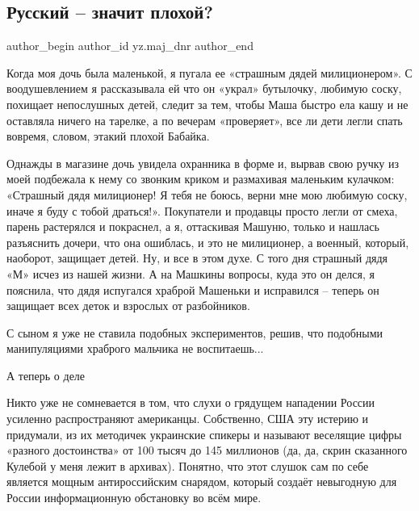  
 
 
 
 
\subsection{Русский – значит плохой?}
\label{sec:19_01_2022.yz.maj_dnr.1.russkij_plohoj}
 
\ifcmt
 author_begin
   author_id yz.maj_dnr
 author_end
\fi

Когда моя дочь была маленькой, я пугала ее «страшным дядей милиционером». С
воодушевлением я рассказывала ей что он «украл» бутылочку, любимую соску,
похищает непослушных детей, следит за тем, чтобы Маша быстро ела кашу и не
оставляла ничего на тарелке, а по вечерам «проверяет», все ли дети легли спать
вовремя, словом, этакий плохой Бабайка.


Однажды в магазине дочь увидела охранника в форме и, вырвав свою ручку из моей
подбежала к нему со звонким криком и размахивая маленьким кулачком: «Страшный
дядя милиционер! Я тебя не боюсь, верни мне мою любимую соску, иначе я буду с
тобой драться!». Покупатели и продавцы просто легли от смеха, парень растерялся
и покраснел, а я, оттаскивая Машуню, только и нашлась разъяснить дочери, что
она ошиблась, и это не милиционер, а военный, который, наоборот, защищает
детей. Ну, и все в этом духе. С того дня страшный дядя «М» исчез из нашей
жизни. А на Машкины вопросы, куда это он делся, я пояснила, что дядя испугался
храброй Машеньки и исправился – теперь он защищает всех деток и взрослых от
разбойников.

С сыном я уже не ставила подобных экспериментов, решив, что подобными
манипуляциями храброго мальчика не воспитаешь...

А теперь о деле

Никто уже не сомневается в том, что слухи о грядущем нападении России усиленно
распространяют американцы. Собственно, США эту истерию и придумали, из их
методичек украинские спикеры и называют веселящие цифры «разного достоинства»
от 100 тысяч до 145 миллионов (да, да, скрин сказанного Кулебой у меня лежит в
архивах). Понятно, что этот слушок сам по себе является мощным антироссийским
снарядом, который создаёт невыгодную для России информационную обстановку во
всём мире.


